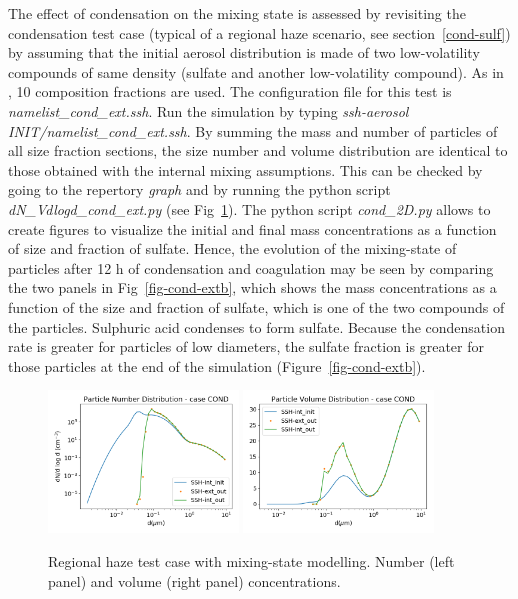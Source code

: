 \documentclass[a4paper,11pt]{article}
\begin{document}
{{The effect of 
condensation on the mixing state is assessed by revisiting the condensation
test case (typical of a regional haze scenario, see section~\ref{cond-sulf}) by assuming
that the initial aerosol distribution is made of two low-volatility compounds
of same density (sulfate and another low-volatility compound).
As in \cite{zhu2015}, 10 composition fractions are used.
The configuration file for this test is {\it{namelist\_cond\_ext.ssh}}.
Run the simulation by typing {\it{ssh-aerosol INIT/namelist\_cond\_ext.ssh}}.
By summing the mass and number of particles of all size fraction sections, the
size number and volume distribution are identical to those obtained with the
internal mixing assumptions. This can be checked by going to the repertory
{\it{graph}} and by running the python script {\it{dN\_Vdlogd\_cond\_ext.py}}
(see Fig~\ref{fig-cond-ext}).
The python script {\it{cond\_2D.py}} allows to create figures to visualize the initial and final mass concentrations as a function of size and fraction of sulfate.
Hence, the evolution of the mixing-state of particles after 12 h of condensation and coagulation may
be seen by comparing the two panels in Fig~\ref{fig-cond-extb}, which shows
the mass concentrations as a function of the size and fraction of
sulfate, which is one of the
two compounds of the particles. 
Sulphuric acid condenses to form
sulfate. Because the condensation rate is greater for particles of
low diameters, the sulfate fraction is greater for those particles at the end
of the simulation (Figure~\ref{fig-cond-extb}).


\begin{figure}[H]
        \begin{center}
                \includegraphics[angle=0,width=0.45\textwidth]{../graph/figure_ref/dNdlogd_COND_EXT.png}
                \includegraphics[angle=0,width=0.45\textwidth]{../graph/figure_ref/dVdlogd_COND_EXT.png}
        \end{center}
\caption{Regional haze test case with mixing-state modelling. Number (left panel) and volume (right panel) concentrations.}
\label{fig-cond-ext}
\end{figure}
 
}}
\end{document}
